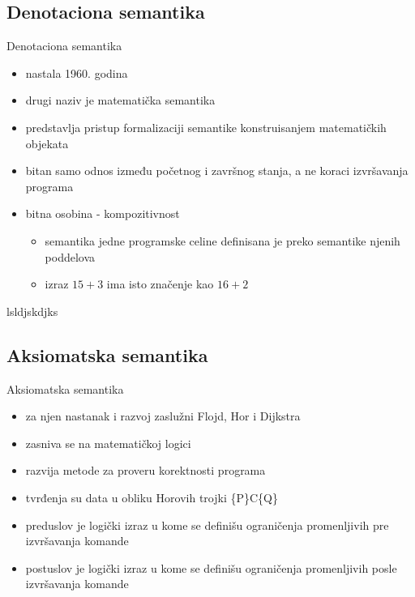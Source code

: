 \documentclass{beamer}
\begin{document}
\subsection{Denotaciona semantika}
\begin{frame}{Denotaciona semantika}
  \begin{itemize}
  \item nastala 1960. godina
  \item drugi naziv je matematička semantika
  \item predstavlja pristup formalizaciji semantike konstruisanjem matematičkih objekata 
  \item bitan samo odnos između početnog i završnog stanja, a ne koraci izvršavanja programa
   \item bitna osobina - kompozitivnost
   \begin{itemize}
   \item semantika jedne programske celine definisana je preko semantike njenih poddelova
   \item izraz $15 + 3$ ima isto značenje kao $16 + 2$
   \end{itemize}
   \end{itemize}
\end{frame}

\begin{frame}{lsldjskdjks}
  
\end{frame}
\subsection{Aksiomatska semantika}
\begin{frame}{Aksiomatska semantika}
  \begin{itemize}
  \item za njen nastanak i razvoj zaslužni Flojd, Hor i Dijkstra
  \item zasniva se na matematičkoj logici
  \item razvija metode za proveru korektnosti programa
   \item tvrđenja su data u obliku Horovih trojki \{P\}C\{Q\}
   \item preduslov je logički izraz u kome se definišu ograničenja promenljivih pre izvršavanja komande
   \item postuslov je logički izraz u kome se definišu ograničenja promenljivih posle izvršavanja komande
  \end{itemize}
\end{frame}
\end{document}

